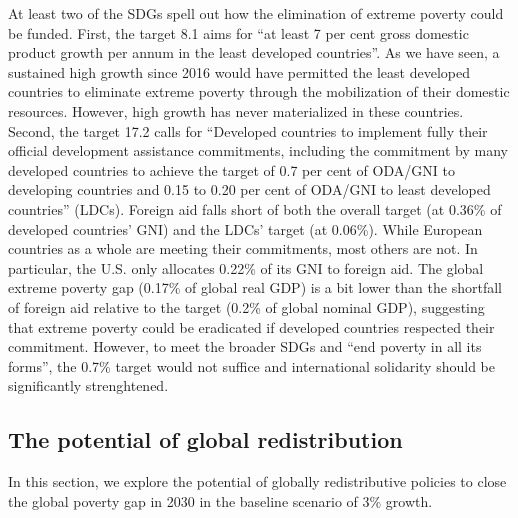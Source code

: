At least two of the SDGs spell out how the elimination of extreme poverty could be funded. %
First, the target 8.1 aims for ``at least 7 per cent gross domestic product growth per annum in the least developed countries''. As we have seen, a sustained high growth since 2016 would have permitted the least developed countries to eliminate extreme poverty through the mobilization of their domestic resources. However, high growth has never materialized in these countries. 
Second, the target 17.2 calls for ``Developed countries to implement fully their official development assistance commitments, including the commitment by many developed countries to achieve the target of 0.7 per cent of ODA/GNI to developing countries and 0.15 to 0.20 per cent of ODA/GNI to least developed countries'' (LDCs). Foreign aid falls short of both the overall target (at 0.36\% of developed countries' GNI) and the LDCs' target (at 0.06\%). While European countries as a whole are meeting their commitments, most others are not. In particular, the U.S. only allocates 0.22\% of its GNI to foreign aid.\cite{oecd_oda_2023} The global extreme poverty gap (0.17\% of global real GDP) is a bit lower than the shortfall of foreign aid relative to the target (0.2\% of global nominal GDP), suggesting that extreme poverty could be eradicated if developed countries respected their commitment. %
However, to meet the broader SDGs and ``end poverty in all its forms'', the 0.7\% target would not suffice and international solidarity should be significantly strenghtened. %

\subsection{The potential of global redistribution} %

In this section, we explore the potential of globally redistributive policies to close the global poverty gap in 2030 in the baseline scenario of 3\% growth. %

